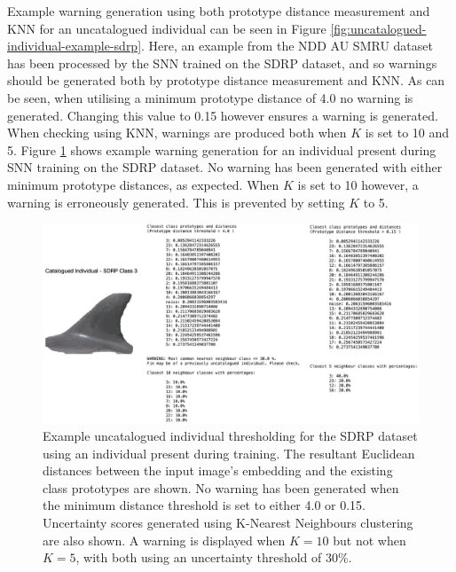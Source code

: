 Example warning generation using both prototype distance measurement and KNN for an uncatalogued individual can be seen in Figure \ref{fig:uncatalogued-individual-example-sdrp}. Here, an example from the NDD AU SMRU dataset has been processed by the SNN trained on the SDRP dataset, and so warnings should be generated both by prototype distance measurement and KNN. As can be seen, when utilising a minimum prototype distance of 4.0 no warning is generated. Changing this value to 0.15 however ensures a warning is generated. When checking using KNN, warnings are produced both when $K$ is set to 10 and 5. Figure \ref{fig:catalogued-individual-example-sdrp} shows example warning generation for an individual present during SNN training on the SDRP dataset. No warning has been generated with either minimum prototype distances, as expected. When $K$ is set to 10 however, a warning is erroneously generated. This is prevented by setting $K$ to 5. 

\begin{figure}
	\begin{center}
		\includegraphics[scale=0.5]{Chapter6/figs/catalogued-individual-thresholding.png}
	\end{center}
	\caption[Example uncatalogued individual thresholding for the SDRP dataset using an individual present during training.]{Example uncatalogued individual thresholding for the SDRP dataset using an individual present during training. The resultant Euclidean distances between the input image's embedding and the existing class prototypes are shown. No warning has been generated when the minimum distance threshold is set to either 4.0 or 0.15. Uncertainty scores generated using K-Nearest Neighbours clustering are also shown. A warning is displayed when $K = 10$ but not when $K = 5$, with both using an uncertainty threshold of 30\%.}
	\label{fig:catalogued-individual-example-sdrp}
\end{figure}

